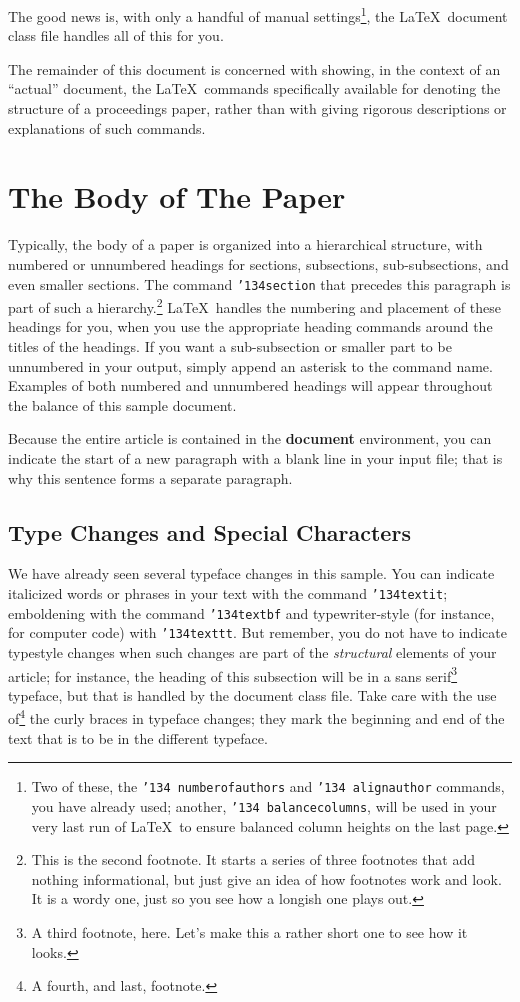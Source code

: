 \documentclass{edm_template}
\begin{document}
The good news is, with only a handful of manual
settings\footnote{Two of these, the {\texttt{\char'134 numberofauthors}}
and {\texttt{\char'134 alignauthor}} commands, you have
already used; another, {\texttt{\char'134 balancecolumns}}, will
be used in your very last run of \LaTeX\ to ensure
balanced column heights on the last page.}, the \LaTeX\ document
class file handles all of this for you.

The remainder of this document is concerned with showing, in
the context of an ``actual'' document, the \LaTeX\ commands
specifically available for denoting the structure of a
proceedings paper, rather than with giving rigorous descriptions
or explanations of such commands.

\section{The {\secit Body} of The Paper}
Typically, the body of a paper is organized
into a hierarchical structure, with numbered or unnumbered
headings for sections, subsections, sub-subsections, and even
smaller sections.  The command \texttt{{\char'134}section} that
precedes this paragraph is part of such a
hierarchy.\footnote{This is the second footnote.  It
starts a series of three footnotes that add nothing
informational, but just give an idea of how footnotes work
and look. It is a wordy one, just so you see
how a longish one plays out.} \LaTeX\ handles the numbering
and placement of these headings for you, when you use
the appropriate heading commands around the titles
of the headings.  If you want a sub-subsection or
smaller part to be unnumbered in your output, simply append an
asterisk to the command name.  Examples of both
numbered and unnumbered headings will appear throughout the
balance of this sample document.

Because the entire article is contained in
the \textbf{document} environment, you can indicate the
start of a new paragraph with a blank line in your
input file; that is why this sentence forms a separate paragraph.

\subsection{Type Changes and {\subsecit Special} Characters}
We have already seen several typeface changes in this sample.  You
can indicate italicized words or phrases in your text with
the command \texttt{{\char'134}textit}; emboldening with the
command \texttt{{\char'134}textbf}
and typewriter-style (for instance, for computer code) with
\texttt{{\char'134}texttt}.  But remember, you do not
have to indicate typestyle changes when such changes are
part of the \textit{structural} elements of your
article; for instance, the heading of this subsection will
be in a sans serif\footnote{A third footnote, here.
Let's make this a rather short one to
see how it looks.} typeface, but that is handled by the
document class file. Take care with the use
of\footnote{A fourth, and last, footnote.}
the curly braces in typeface changes; they mark
the beginning and end of
the text that is to be in the different typeface.
\end{document}
